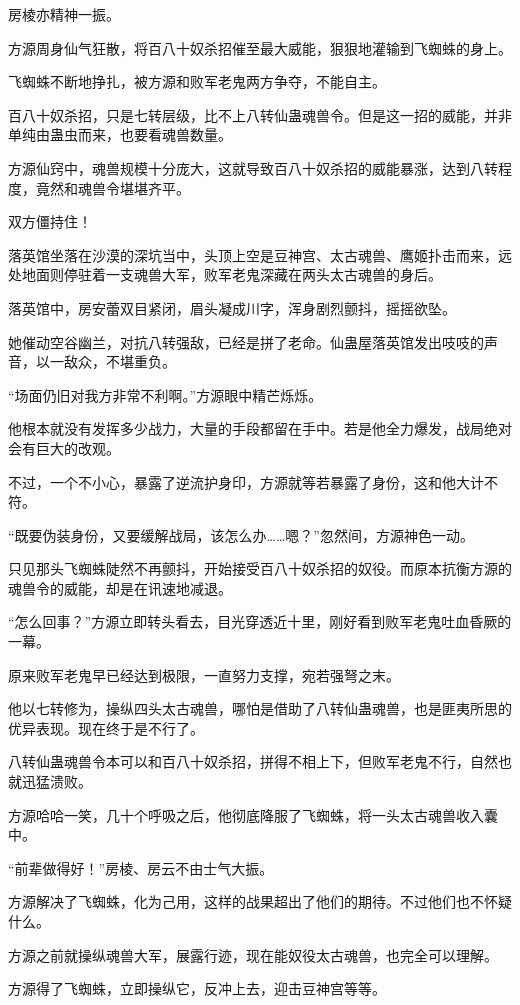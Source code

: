 \begin{this_body}
房棱亦精神一振。

方源周身仙气狂散，将百八十奴杀招催至最大威能，狠狠地灌输到飞蜘蛛的身上。

飞蜘蛛不断地挣扎，被方源和败军老鬼两方争夺，不能自主。

百八十奴杀招，只是七转层级，比不上八转仙蛊魂兽令。但是这一招的威能，并非单纯由蛊虫而来，也要看魂兽数量。

方源仙窍中，魂兽规模十分庞大，这就导致百八十奴杀招的威能暴涨，达到八转程度，竟然和魂兽令堪堪齐平。

双方僵持住！

落英馆坐落在沙漠的深坑当中，头顶上空是豆神宫、太古魂兽、鹰姬扑击而来，远处地面则停驻着一支魂兽大军，败军老鬼深藏在两头太古魂兽的身后。

落英馆中，房安蕾双目紧闭，眉头凝成川字，浑身剧烈颤抖，摇摇欲坠。

她催动空谷幽兰，对抗八转强敌，已经是拼了老命。仙蛊屋落英馆发出吱吱的声音，以一敌众，不堪重负。

“场面仍旧对我方非常不利啊。”方源眼中精芒烁烁。

他根本就没有发挥多少战力，大量的手段都留在手中。若是他全力爆发，战局绝对会有巨大的改观。

不过，一个不小心，暴露了逆流护身印，方源就等若暴露了身份，这和他大计不符。

“既要伪装身份，又要缓解战局，该怎么办……嗯？”忽然间，方源神色一动。

只见那头飞蜘蛛陡然不再颤抖，开始接受百八十奴杀招的奴役。而原本抗衡方源的魂兽令的威能，却是在讯速地减退。

“怎么回事？”方源立即转头看去，目光穿透近十里，刚好看到败军老鬼吐血昏厥的一幕。

原来败军老鬼早已经达到极限，一直努力支撑，宛若强弩之末。

他以七转修为，操纵四头太古魂兽，哪怕是借助了八转仙蛊魂兽，也是匪夷所思的优异表现。现在终于是不行了。

八转仙蛊魂兽令本可以和百八十奴杀招，拼得不相上下，但败军老鬼不行，自然也就迅猛溃败。

方源哈哈一笑，几十个呼吸之后，他彻底降服了飞蜘蛛，将一头太古魂兽收入囊中。

“前辈做得好！”房棱、房云不由士气大振。

方源解决了飞蜘蛛，化为己用，这样的战果超出了他们的期待。不过他们也不怀疑什么。

方源之前就操纵魂兽大军，展露行迹，现在能奴役太古魂兽，也完全可以理解。

方源得了飞蜘蛛，立即操纵它，反冲上去，迎击豆神宫等等。


\end{this_body}
